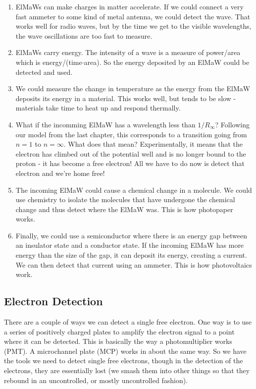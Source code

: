 \begin{enumerate}
\item ElMaWs can make charges in matter accelerate. If we could connect a very fast ammeter to some kind of metal antenna, we could detect the wave. That works well for radio waves, but by the time we get to the visible wavelengths, the wave oscillations are too fast to measure.
\item ElMaWs carry energy. The intensity of a wave is a measure of power/area which is energy/(time$\cdot$area). So the energy deposited by an ElMaW could be detected and used.
\item We could measure the change in temperature as the energy from the ElMaW deposits its energy in a material. This works well, but tends to be slow - materials take time to heat up and respond thermally.
\item What if the incomming ElMaW has a wavelength less than $1/R_\infty$? Following our model from the last chapter, this corresponds to a transition going from $n=1$ to $n=\infty$. What does that mean? Experimentally, it means that the electron has climbed out of the potential well and is no longer bound to the proton - it has become a free electron! All we have to do now is detect that electron and we're home free!
\item The incoming ElMaW could cause a chemical change in a molecule. We could use chemistry to isolate the molecules that have undergone the chemical change and thus detect where the ElMaW was. This is how photopaper works.
\item Finally, we could use a semiconductor where there is an energy gap between an insulator state and a conductor state. If the incoming ElMaW has more energy than the size of the gap, it can deposit its energy, creating a current. We can then detect that current using an ammeter. This is how photovoltaics work.

\end{enumerate}

\subsection{Electron Detection}

There are a couple of ways we can detect a single free electron. One way is to use a series of positively charged plates to amplify the electron signal to a point where it can be detected. This is basically the way a photomultiplier works (PMT).  A microchannel plate (MCP) works in about the same way. So we have the tools we need to detect single free electrons, though in the detection of the electrons, they are essentially lost (\ie we smash them into other things so that they rebound in an uncontrolled, or mostly uncontrolled fashion).

